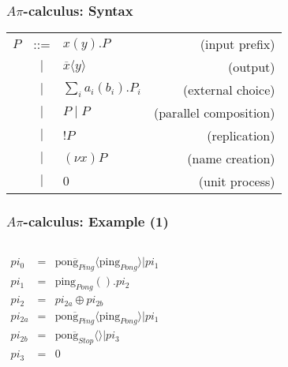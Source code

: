 \documentclass{beamer}
\begin{document}
\begin{frame}[label=piSyntax]
\frametitle{$A\pi$-calculus: Syntax}
\begin{tabular}{lclr}
$P$ & ::= & $x(y).P $                           & (input prefix)\\
    & $|$ & $\overline{x} \langle y \rangle $   & (output)\\
    & $|$ & $ \sum_i a_i(b_i).P_i $             & (external choice) \\
    & $|$ & $P\;|\;P $                          & (parallel composition)\\
    & $|$ & $!P $                               & (replication) \\
    & $|$ & $(\nu x)P $                         & (name creation)\\
    & $|$ & $0 $                                & (unit process)
\end{tabular}
\end{frame}

\begin{frame}
\frametitle{$A\pi$-calculus: Example (1)}
\begin{columns}

\column{5cm}
\begin{eqnarray*}
pi_0    & = & \overline{\text{pong}_{Ping}}\langle \text{ping}_{Pong} \rangle | pi_1\\
pi_1    & = & \text{ping}_{Pong}().pi_2 \\
pi_2    & = & pi_{2a} \oplus pi_{2b} \\
pi_{2a} & = & \overline{\text{pong}_{Ping}}\langle \text{ping}_{Pong} \rangle | pi_1\\
pi_{2b} & = & \overline{\text{pong}_{Stop}}\langle \rangle | pi_3 \\
pi_3    & = & 0
\end{eqnarray*}

\column{5cm}
\begin{figure}
\end{figure}
\end{columns}
\end{frame}
\end{document}
